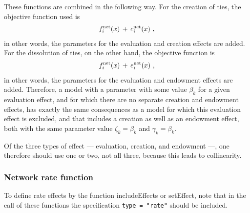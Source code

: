 \documentclass[a4paper,fleqn,11pt]{article}
\newcommand{\+}{\, + \,}
\newcommand{\sfn}[1]{\textsf{#1}}
\begin{document}
These functions are combined in the following way.
For the creation of ties, the objective function used is
\begin{equation}
f_i^{\rm net}(x) \,+\, c_i^{\rm net}(x)     \ ,             \label{fc_net}
\end{equation}
in other words, the parameters for the evaluation and creation effects are
added.
For the dissolution of ties, on the other hand, the objective function is
\begin{equation}
f_i^{\rm net}(x) \,+\, e_i^{\rm net}(x)      \ ,            \label{fe_net}
\end{equation}
in other words, the parameters for the evaluation and endowment effects are
added.
Therefore, a model with a parameter with some value $\beta_k$
for a given evaluation effect,
and for which there are no separate creation and endowment effects,
has exactly the same consequences as a model for which this
evaluation effect is excluded, and that includes a creation as well as
an endowment effect, both with the same parameter value
$\zeta_k = \beta_k$ and $\gamma_k = \beta_k$.

Of the three types of effect --- evaluation, creation, and endowment ---,
one therefore should use one or two, not all three, because this leads to collinearity.


\subsubsection{Network rate function} \label{S_r}

To define rate effects by the function \sfn{includeEffects} or \textsf{setEffect},
note that in the call of these functions the specification
\texttt{type = "rate"} should be included.
\medskip
\end{document}
